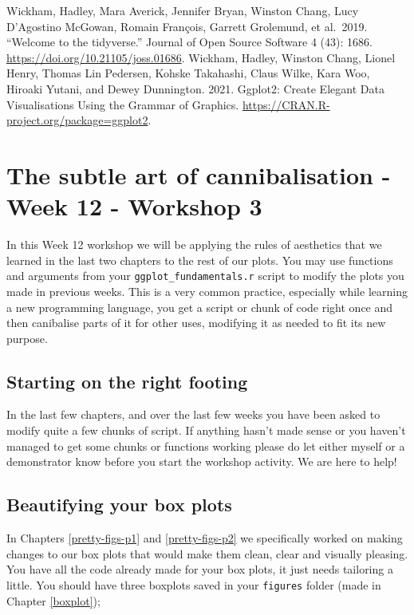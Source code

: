\documentclass[
]{book}
\begin{document}
Wickham, Hadley, Mara Averick, Jennifer Bryan, Winston Chang, Lucy D'Agostino McGowan, Romain François, Garrett Grolemund, et al.~2019. ``Welcome to the tidyverse.'' Journal of Open Source Software 4 (43): 1686. \url{https://doi.org/10.21105/joss.01686}.
Wickham, Hadley, Winston Chang, Lionel Henry, Thomas Lin Pedersen, Kohske Takahashi, Claus Wilke, Kara Woo, Hiroaki Yutani, and Dewey Dunnington. 2021. Ggplot2: Create Elegant Data Visualisations Using the Grammar of Graphics. \url{https://CRAN.R-project.org/package=ggplot2}.

\chapter{The subtle art of cannibalisation - Week 12 - Workshop 3}\label{cannibalisation}

In this Week 12 workshop we will be applying the rules of aesthetics that we learned in the last two chapters to the rest of our plots. You may use functions and arguments from your \texttt{ggplot\_fundamentals.r} script to modify the plots you made in previous weeks. This is a very common practice, especially while learning a new programming language, you get a script or chunk of code right once and then canibalise parts of it for other uses, modifying it as needed to fit its new purpose.

\section{Starting on the right footing}\label{starting-on-the-right-footing}

In the last few chapters, and over the last few weeks you have been asked to modify quite a few chunks of script. If anything hasn't made sense or you haven't managed to get some chunks or functions working please do let either myself or a demonstrator know before you start the workshop activity. We are here to help!

\section{Beautifying your box plots}\label{beautifying-your-box-plots}

In Chapters \ref{pretty-figs-p1} and \ref{pretty-figs-p2} we specifically worked on making changes to our box plots that would make them clean, clear and visually pleasing. You have all the code already made for your box plots, it just needs tailoring a little. You should have three boxplots saved in your \texttt{figures} folder (made in Chapter \ref{boxplot});
\end{document}
